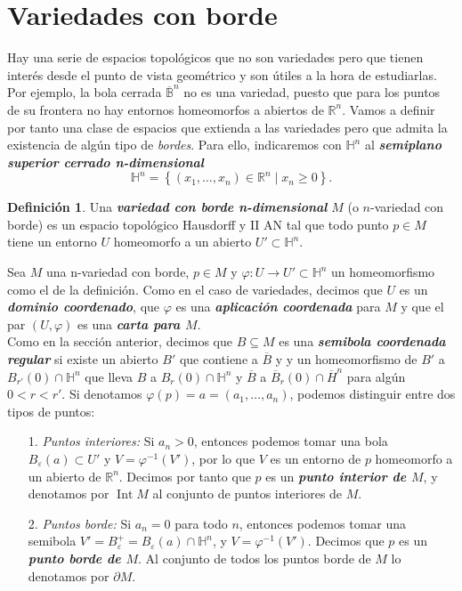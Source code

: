 \documentclass[10pt]{report}
\newcommand{\R}{\mathbb{R}}
\DeclareMathOperator{\interior}{Int} %
\newcommand{\enfatiza}[1]{\textbf{\textit{#1}}}
\theoremstyle{definition}
\newtheorem{defin}{Definición}[section]
\begin{document}
\section{Variedades con borde}\label{sec:borde}
Hay una serie de espacios topológicos que no son variedades pero que tienen interés desde el punto de vista geométrico y son útiles a la hora de estudiarlas. Por ejemplo, la bola cerrada $\overline{\mathbb{B}}^n$ no es una variedad, puesto que para los puntos de su frontera no hay entornos homeomorfos a abiertos de $\R^n$. Vamos a definir por tanto una clase de espacios que extienda a las variedades pero que admita la existencia de algún tipo de \textit{bordes}. Para ello, indicaremos con $\mathbb{H}^n$ al \enfatiza{semiplano superior cerrado n-dimensional} $$\mathbb{H}^n=
\left\{(x_1,\dots ,x_n)\in \R^n\mid x_n\geq 0\right\}.$$
\begin{defin}
Una \enfatiza{variedad con borde n-dimensional} $M$ (o $n$-variedad con borde) es un espacio topológico  Hausdorff y II AN tal que todo punto $p\in M$ tiene un entorno $U$ homeomorfo a un abierto $U'\subset \mathbb{H}^n$.
\end{defin}
Sea $M$ una n-variedad con borde, $p\in M$ y $\varphi :U\to U'\subset \mathbb{H}^n$ un homeomorfismo como el de la definición. Como en el caso de variedades, decimos que $U$ es un \enfatiza{dominio coordenado}, que $\varphi$ es una \enfatiza{aplicación coordenada} para $M$ y que el par $(U,\varphi )$ es una \enfatiza{carta para $M$}.\\
Como en la sección anterior, decimos que $B\subseteq M$ es una \enfatiza{semibola coordenada regular} si existe un abierto $B'$ que contiene a $\overline{B}$ y y un homeomorfismo de $B'$ a $B_{r'}(0)\cap \mathbb{H}^n$ que lleva $B$ a $B_r(0)\cap \mathbb{H}^n$ y $\overline{B}$ a $\overline{B}_r(0)\cap \overline{H}^n$ para algún $0<r<r'$.
Si denotamos $\varphi (p)=a=(a_1,\dots ,a_n)$, podemos distinguir entre dos tipos de puntos:
\begin{itemize}

\item[1.] \textit{Puntos interiores:} Si $a_n>0$, entonces podemos tomar una bola $B_{\varepsilon}(a)\subset U'$ y $V=\varphi^{-1}(V')$, por lo que $V$ es un entorno de $p$ homeomorfo a un abierto de $\R^n$. Decimos por tanto que $p$ es un \enfatiza{punto interior de $M$}, y denotamos por $\interior{M}$ al conjunto de puntos interiores de $M$.
\item[2.] \textit{Puntos borde:} Si $a_n=0$ para todo $n$, entonces podemos tomar una semibola $V'=B_{\varepsilon}^{+}=B_{\varepsilon}(a)\cap \mathbb{H}^n$, y $V=\varphi^{-1}(V')$. Decimos que $p$ es un \enfatiza{punto borde de $M$}. Al conjunto de todos los puntos borde de $M$ lo denotamos por $\partial M$.
\end{itemize}
\end{document}
